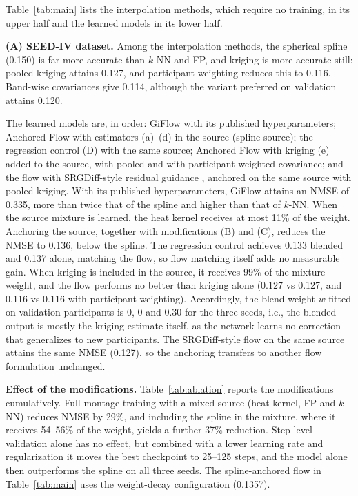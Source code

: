 \documentclass{article}
\begin{document}
Table~\ref{tab:main} lists the interpolation methods, which require no
training, in its upper half and the learned models in its lower half.

\textbf{(A) SEED-IV dataset.} Among the interpolation methods, the
spherical spline (0.150) is far more accurate than $k$-NN and FP, and
kriging is more accurate still: pooled kriging attains 0.127, and
participant weighting reduces this to 0.116. Band-wise covariances give
0.114, although the variant preferred on validation attains 0.120.

The learned models are, in order: GiFlow with its published
hyperparameters; Anchored Flow with estimators (a)--(d) in the source
(spline source); the regression control (D) with the same source;
Anchored Flow with kriging (e) added to the source, with pooled and with
participant-weighted covariance; and the flow with SRGDiff-style residual
guidance \cite{liu2026srgdiff}, anchored on the same source with pooled
kriging. With its published hyperparameters, GiFlow attains an NMSE of
0.335, more than twice that of the spline and higher than that of $k$-NN.
When the source mixture is learned, the heat kernel receives at most 11\%
of the weight. Anchoring the source, together with modifications (B) and
(C), reduces the NMSE to 0.136, below the spline. The regression control
achieves 0.133 blended and 0.137 alone, matching the flow, so flow
matching itself adds no measurable gain. When kriging is included in the
source, it receives 99\% of the mixture weight, and the flow performs no
better than kriging alone (0.127 vs 0.127, and 0.116 vs 0.116 with
participant weighting). Accordingly, the blend weight $w$ fitted on
validation participants is 0, 0 and 0.30 for the three seeds, i.e., the
blended output is mostly the kriging estimate itself, as the network
learns no correction that generalizes to new participants. The
SRGDiff-style flow on the same source attains the same NMSE (0.127), so
the anchoring transfers to another flow formulation unchanged.

\textbf{Effect of the modifications.} Table~\ref{tab:ablation} reports the
modifications cumulatively. Full-montage training with a mixed source
(heat kernel, FP and $k$-NN) reduces NMSE by 29\%, and including the spline in the mixture, where it
receives 54--56\% of the weight, yields a further 37\% reduction.
Step-level validation alone has no effect, but combined with a lower
learning rate and regularization it moves the best checkpoint to 25--125
steps, and the model alone then outperforms the spline on all three seeds.
The spline-anchored flow in Table~\ref{tab:main} uses the weight-decay
configuration (0.1357).
\end{document}
